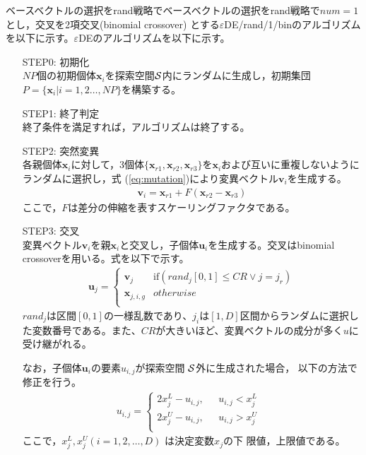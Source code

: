\documentclass[a4paper,12pt]{jsreport}
\begin{document}
ベースベクトルの選択をrand戦略でベースベクトルの選択をrand戦略で$num=1$とし，交叉を2項交叉(binomial crossover) とする$\varepsilon$DE/rand/1/binのアルゴリズムを以下に示す。$\varepsilon$DEのアルゴリズムを以下に示す。
\begin{enumerate}
\item[STEP0:]\mbox{初期化}\\ 
$NP$個の初期個体$\bm{x}_i$を探索空間$\cal{S}$内にランダムに生成し，初期集団$P= \{ \bm{x}_i| i=1,2 \dots ,NP \}$を構築する。

\item[STEP1:]\mbox{終了判定}\\ 
終了条件を満足すれば，アルゴリズムは終了する。

\item[STEP2:]\mbox{突然変異}\\ 
各親個体$\bm{x}_i$に対して，3個体$ \{  \bm{x}_{r1},\bm{x}_{r2},\bm{x}_{r3}  \} $を$\bm{x}_i$および互いに重複しないようにランダムに選択し，式
(\ref{eq:mutation})により変異ベクトル$\bm{v}_i$を生成する。
 \begin{eqnarray}
 \bm{v}_i= \bm{x}_{r1}+ F (\bm{x}_{r2}-\bm{x}_{r3})
\label{eq:mutation}
\end{eqnarray}
ここで，$F$は差分の伸縮を表すスケーリングファクタである。

\item[STEP3:]\mbox{交叉}\\ 
変異ベクトル$\bm{v}_i$を親$\bm{x}_i$と交叉し，子個体$\bm{u}_{i}$を生成する。交叉はbinomial crossoverを用いる。式を以下で示す。
\begin{eqnarray}
\bm{u}_j=
\left\{
\begin{array}{cc}
    \bm{v}_j & \mbox{if$({rand}_j[0,1]\leq CR \vee j={j}_r)$}\\
    \bm{x}_{j,i,g} & \mbox{$otherwise$}\\
\end{array}
\right.
\end{eqnarray}
${rand}_j$は区間$[0,1]$の一様乱数であり、${j}_i$は$[1,D]$区間からランダムに選択した変数番号である。また、$CR$が大きいほど、変異ベクトルの成分が多く$u$に受け継がれる。

なお，子個体$\bm{u}_i$の要素$u_{i,j}$が探索空間 $\cal{S}$外に生成された場合，
以下の方法で修正を行う。
\begin{eqnarray}
u_{i,j} =
\left\{
\begin{array}{ll}
 2x^{L}_j-u_{i,j},  & \mbox{ $u_{i,j} <x^{L}_j $   } \\
  2x^{U}_j-u_{i,j},		   & \mbox{ $u_{i,j} >x^{U}_j $ } \\
\end{array}
\right.
\end{eqnarray}
ここで，$x^{L}_j, x^{U}_j (i = 1, 2, \dots ,D)$ は決定変数$x_j$の下
限値，上限値である。


\end{enumerate}
\end{document}
